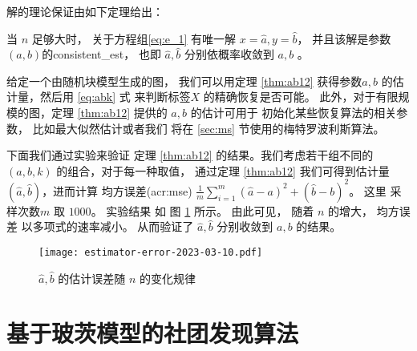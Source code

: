 解的理论保证由如下定理给出：
\begin{theorem}\label{thm:ab12}
当 $n$ 足够大时，
关于方程组\eqref{eq:e_1}
有唯一解 $x=\hat{a}, y=\hat{b}$，
并且该解是参数$(a,b)$的\gls{consistent_est}，
也即 $\hat{a}, \hat{b}$ 
分别依概率收敛到 $a,b$ 。
\end{theorem}
给定一个由随机块模型生成的图，
我们可以用定理 \ref{thm:ab12} 获得参数$a,b$ 
的估计量，然后用 \eqref{eq:abk}
式
来判断标签$X$ 的精确恢复是否可能。
此外，对于有限规模的图，定理 \ref{thm:ab12} 提供的 $a,b$ 的估计可用于
初始化某些恢复算法的相关参数，
比如最大似然估计或者我们
将在 \ref{sec:ms} 节使用的梅特罗波利斯算法。

下面我们通过实验来验证
定理 \ref{thm:ab12} 的结果。我们考虑若干组不同的
$(a,b,k)$ 的组合，对于每一种取值，
通过定理 \ref{thm:ab12} 我们可得到估计量
$(\hat{a}, \hat{b})$，进而计算
均方误差(\gls{acr:mse})
$\frac{1}{m} \sum_{i=1}^m (\hat{a}-a)^2 + (\hat{b}-b)^2$。
这里  采样次数$m$ 取 $1000$。
实验结果 如
图 \ref{fig:estimator} 所示。
由此可见， 随着 $n$ 的增大，
均方误差 以多项式的速率减小。
从而验证了 $\hat{a}, \hat{b}$ 分别收敛到 $a,b$ 
的结果。

\begin{figure}[ht!]
	\centering
		\texttt{[image: estimator-error-2023-03-10.pdf]}
		\caption{ $\hat{a}, \hat{b}$ 的估计误差随
		$n$ 的变化规律 }\label{fig:estimator}
\end{figure}

\section{基于玻茨模型的社团发现算法}\label{sec:potts}
